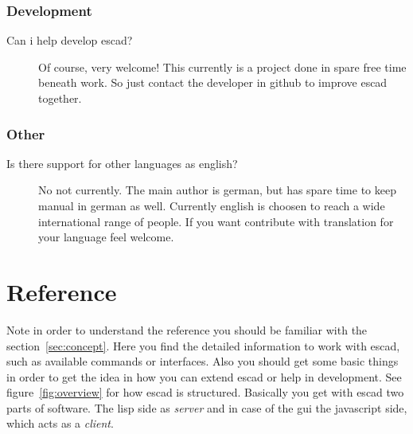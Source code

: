 \documentclass[a4paper, 12pt, openany]{scrbook}
\begin{document}
\subsection{Development}
\begin{description}
\item[Can i help develop escad?] Of course, very welcome! This currently is a project done in spare free time beneath work. So just contact the developer in github to improve escad together.
\end{description}
\subsection{Other}
\begin{description}
\item[Is there support for other languages as english?]  No not currently. The main author is german, but has spare time to keep manual in german as well. Currently english is choosen to reach a wide international range of people. If you want contribute with translation for your language feel welcome.
\end{description}
\chapter{Reference}
Note in order to understand the reference you should be familiar with the section~\ref{sec:concept}. Here you find the detailed information to work with escad, such as available commands or interfaces. Also you should get some basic things in order to get the idea in how you can extend escad or help in development.
See figure~\ref{fig:overview} for how escad is structured. Basically you get with escad two parts of software. The lisp side as \emph{server} and in case of the gui the javascript side, which acts as a \emph{client}.
\end{document}
